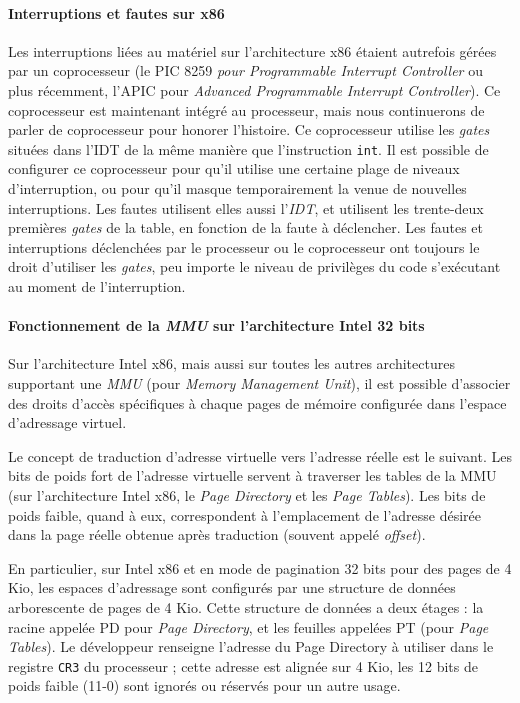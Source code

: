 \paragraph{Interruptions et fautes sur x86}

Les interruptions liées au matériel sur l'architecture x86 étaient autrefois gérées par un coprocesseur (le PIC 8259 \emph{pour Programmable Interrupt Controller} ou plus récemment, l'APIC pour \emph{Advanced Programmable Interrupt Controller}). Ce coprocesseur est maintenant intégré au processeur, mais nous continuerons de parler de coprocesseur pour honorer l'histoire. Ce coprocesseur utilise les \emph{gates} situées dans l'IDT de la même manière que l'instruction \texttt{int}. Il est possible de configurer ce coprocesseur
pour qu'il utilise une certaine plage de niveaux d'interruption, ou pour qu'il masque temporairement la venue de nouvelles interruptions. Les fautes utilisent elles aussi l'\emph{IDT}, et utilisent les trente-deux premières \emph{gates} de la table, en fonction de la faute à déclencher. Les fautes et interruptions déclenchées par le processeur ou le coprocesseur ont toujours le droit d'utiliser les \emph{gates}, peu importe le niveau de privilèges du code s'exécutant au moment de l'interruption.

\paragraph{Fonctionnement de la \emph{MMU} sur l'architecture Intel 32 bits}
\label{sec:intel_mmu}
Sur l'architecture Intel x86, mais aussi sur toutes les autres architectures supportant une \emph{MMU} (pour \emph{Memory Management Unit}), il est possible d'associer des droits d'accès spécifiques à chaque pages de mémoire configurée dans l'espace d'adressage virtuel.

Le concept de traduction d'adresse virtuelle vers l'adresse réelle est le suivant. Les bits de poids fort de l'adresse virtuelle servent à traverser les tables de la MMU (sur l'architecture Intel x86, le \emph{Page Directory} et les \emph{Page Tables}). Les bits de poids faible, quand à eux, correspondent à l'emplacement de l'adresse désirée dans la page réelle obtenue après traduction (souvent appelé \emph{offset}).

En particulier, sur Intel x86 et en mode de pagination 32 bits pour des pages de 4 Kio, les espaces d'adressage sont configurés par une structure de données arborescente de pages de 4 Kio. Cette structure de données a deux étages : la racine appelée PD pour \emph{Page Directory}, et les feuilles appelées PT (pour \emph{Page Tables}). Le développeur renseigne l'adresse du Page Directory à utiliser dans le registre \texttt{CR3} du processeur ; cette adresse est alignée sur 4 Kio, les 12 bits de poids faible (11-0) sont ignorés ou réservés pour un autre usage.

